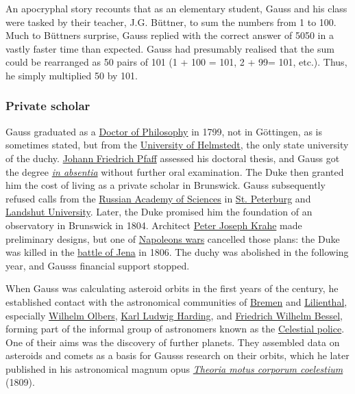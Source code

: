 An apocryphal story recounts that as an elementary student, Gauss and his class were tasked by their teacher, J.G. Büttner, to sum the numbers from 1 to 100. Much to Büttner\textquotesingle s surprise, Gauss replied with the correct answer of 5050 in a vastly faster time than expected. Gauss had presumably realised that the sum could be rearranged as 50 pairs of 101 (1 + 100 = 101, 2 + 99= 101, etc.). Thus, he simply multiplied 50 by 101.


\subsubsection{Private scholar}\label{Private_scholar}

Gauss graduated as a \href{https://en.wikipedia.org/wiki/Doctor_of_Philosophy}{Doctor of Philosophy} in 1799, not in Göttingen, as is sometimes stated, but from the \href{https://en.wikipedia.org/wiki/University_of_Helmstedt}{University of Helmstedt}, the only state university of the duchy. \href{https://en.wikipedia.org/wiki/Johann_Friedrich_Pfaff}{Johann Friedrich Pfaff} assessed his doctoral thesis, and Gauss got the degree \emph{\href{https://en.wikipedia.org/wiki/Graduation}{in absentia}} without further oral examination. The Duke then granted him the cost of living as a private scholar in Brunswick. Gauss subsequently refused calls from the \href{https://en.wikipedia.org/wiki/Russian_Academy_of_Sciences}{Russian Academy of Sciences} in \href{https://en.wikipedia.org/wiki/St._Peterburg}{St. Peterburg} and \href{https://en.wikipedia.org/wiki/Ludwig_Maximilian_University_of_Munich}{Landshut University}. Later, the Duke promised him the foundation of an observatory in Brunswick in 1804. Architect \href{https://en.wikipedia.org/wiki/Peter_Joseph_Krahe}{Peter Joseph Krahe} made preliminary designs, but one of \href{https://en.wikipedia.org/wiki/War_of_the_Fourth_Coalition}{Napoleon\textquotesingle s wars} cancelled those plans: the Duke was killed in the \href{https://en.wikipedia.org/wiki/Battle_of_Jena–Auerstedt}{battle of Jena} in 1806. The duchy was abolished in the following year, and Gauss\textquotesingle s financial support stopped.

When Gauss was calculating asteroid orbits in the first years of the century, he established contact with the astronomical communities of \href{https://en.wikipedia.org/wiki/Bremen}{Bremen} and \href{https://en.wikipedia.org/wiki/Lilienthal,_Lower_Saxony}{Lilienthal}, especially \href{https://en.wikipedia.org/wiki/Wilhelm_Olbers}{Wilhelm Olbers}, \href{https://en.wikipedia.org/wiki/Karl_Ludwig_Harding}{Karl Ludwig Harding}, and \href{https://en.wikipedia.org/wiki/Friedrich_Wilhelm_Bessel}{Friedrich Wilhelm Bessel}, forming part of the informal group of astronomers known as the \href{https://en.wikipedia.org/wiki/Celestial_police}{Celestial police}. One of their aims was the discovery of further planets. They assembled data on asteroids and comets as a basis for Gauss\textquotesingle s research on their orbits, which he later published in his astronomical magnum opus \emph{\href{https://en.wikipedia.org/wiki/Theoria_motus_corporum_coelestium?action=edit&redlink=1}{Theoria motus corporum coelestium}} (1809).


